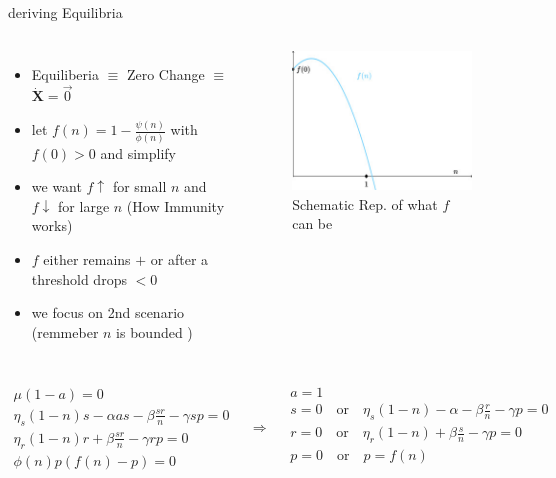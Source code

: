 \documentclass{beamer}
\begin{document}
\begin{frame}[shrink=20]{deriving Equilibria}
  \begin{columns}
      \begin{itemize}
          \item Equiliberia $\equiv$ Zero Change $\equiv$  \( \dot{\mathbf{X}} = \vec{0} \)
          \item let \(f(n) = 1 - \frac{\psi(n)}{\phi(n)}\) with \(f(0)>0\) and simplify
          \item we want \( f \uparrow \) for small \(n\) and \(f \downarrow \) for large \(n\) (How Immunity works)
          \item \(f\) either remains \(+\) or after a threshold drops \(< 0\)
          \item we focus on 2nd scenario (remmeber \( n \) is bounded )
      \end{itemize}
      \begin{figure}
        \includegraphics[width=\textwidth]{1-s2.0-S1007570424005975-gr2.jpg}
        \caption{Schematic Rep. of what \(f\) can be}
      \end{figure}
  \end{columns}
  \vspace{-5mm}
  \[\begin{array}{l}
    \mu(1 - a)  = 0 \\
    \eta_s(1 - n)s - \alpha as - \beta \frac{sr}{n} - \gamma sp = 0 \\
    \eta_r(1 - n)r + \beta \frac{sr}{n} - \gamma rp = 0 \\
    \phi(n)p(f(n) -p ) = 0 
  \end{array} \quad \Rightarrow \quad \begin{array}{l}
    a = 1 \\
    s = 0 \quad \text{or} \quad \eta_s(1-n) - \alpha - \beta\frac{r}{n} -\gamma p =0 \\
    r = 0 \quad \text{or} \quad \eta_r(1-n) + \beta\frac{s}{n} -\gamma p =0 \\
    p = 0 \quad \text{or} \quad p = f(n) \\
  \end{array} \]
\end{frame}
\end{document}
